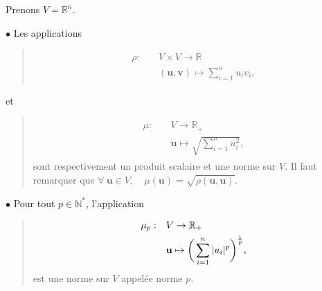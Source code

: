 \documentclass[letterpaper,11pt,english]{sphinxmanual}
\begin{document}
\begin{DUlineblock}{0em}
\item[] 
\item[] Prenons \(V=\mathbb{R}^n\).
\item[] \(\bullet\) Les applications
\end{DUlineblock}
\begin{quote}
\begin{equation}\label{equation:chapter2:chapter2:16}
\begin{split}\begin{aligned}
    \rho:\quad &V\times V\rightarrow{\mathbb{R}}\\
    &(\mathbf{u},\mathbf{v})\mapsto \sum_{i=1}^{n}u_iv_i ,\end{aligned}\end{split}
\end{equation}\end{quote}

\begin{DUlineblock}{0em}
\item[] et
\end{DUlineblock}
\begin{quote}
\begin{equation}\label{equation:chapter2:chapter2:17}
\begin{split}\begin{aligned}
    \mu:\quad &V\rightarrow{\mathbb{R}_+}\\
    &\mathbf{u}\mapsto \sqrt{\sum_{i=1}^{n}u_i^2},\end{aligned}\end{split}
\end{equation}
\sphinxAtStartPar
sont respectivement un produit scalaire et une norme sur \(V\).
Il faut remarquer que
\(\forall\  \mathbf{u} \in V, \quad \mu(\mathbf{u})=\sqrt{\rho(\mathbf{u},\mathbf{u})}\).
\end{quote}

\begin{DUlineblock}{0em}
\item[] \(\bullet\) Pour tout \(p\in \mathbb{N}^*\), l’application
\end{DUlineblock}
\begin{quote}
\begin{equation}\label{equation:chapter2:chapter2:18}
\begin{split}\begin{aligned}
    \mu_p:\quad &V\rightarrow{\mathbb{R}_+}\\
    &\mathbf{u}\mapsto \bigg{(}\sum_{i=1}^{n}|u_i|^p\bigg{)}^{\frac{1}{p}},\end{aligned}\end{split}
\end{equation}
\sphinxAtStartPar
est une norme sur \(V\) appelée norme \(p\).
\end{quote}
\end{document}
